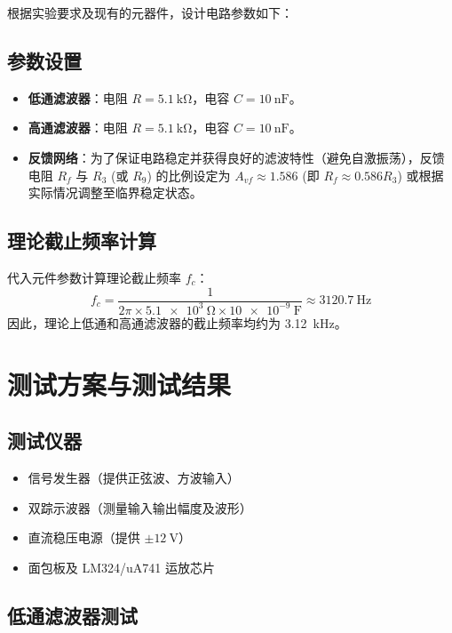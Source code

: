 \documentclass[UTF8, a4paper]{ctexrep} %
\begin{document}
根据实验要求及现有的元器件，设计电路参数如下：

\subsection{参数设置}
\begin{itemize}
    \item \textbf{低通滤波器}：电阻 $R = \SI{5.1}{\kilo\ohm}$，电容 $C = \SI{10}{\nano\farad}$。
    \item \textbf{高通滤波器}：电阻 $R = \SI{5.1}{\kilo\ohm}$，电容 $C = \SI{10}{\nano\farad}$。
    \item \textbf{反馈网络}：为了保证电路稳定并获得良好的滤波特性（避免自激振荡），反馈电阻 $R_f$ 与 $R_3$ (或 $R_9$) 的比例设定为 $A_{vf} \approx 1.586$ (即 $R_f \approx 0.586 R_3$) 或根据实际情况调整至临界稳定状态。
\end{itemize}

\subsection{理论截止频率计算}
代入元件参数计算理论截止频率 $f_c$：
\begin{equation}
    f_c = \frac{1}{2\pi \times \SI{5.1e3}{\ohm} \times \SI{10e-9}{\farad}} \approx \SI{3120.7}{\hertz}
\end{equation}
因此，理论上低通和高通滤波器的截止频率均约为 \SI{3.12}{\kilo\hertz}。

\section{测试方案与测试结果}
\label{sec:filter_results}

\subsection{测试仪器}
\begin{itemize}
    \item 信号发生器（提供正弦波、方波输入）
    \item 双踪示波器（测量输入输出幅度及波形）
    \item 直流稳压电源（提供 $\pm \SI{12}{\volt}$）
    \item 面包板及 LM324/uA741 运放芯片
\end{itemize}

\subsection{低通滤波器测试}
\end{document}

